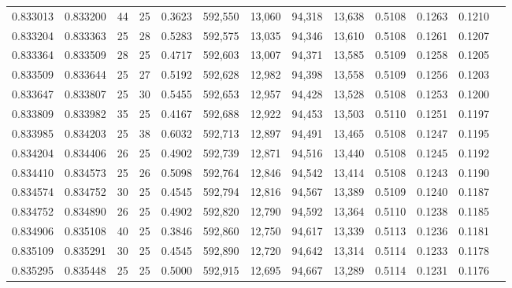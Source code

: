 \begin{tabular}{rrrrrrrrrrrrr}
0.833013 & 0.833200 &    44 &  25 &                                     0.3623 & 592,550 &  13,060 &  94,318 &  13,638 & 0.5108 & 0.1263 & 0.1210 \\
0.833204 & 0.833363 &    25 &  28 &                                     0.5283 & 592,575 &  13,035 &  94,346 &  13,610 & 0.5108 & 0.1261 & 0.1207 \\
0.833364 & 0.833509 &    28 &  25 &                                     0.4717 & 592,603 &  13,007 &  94,371 &  13,585 & 0.5109 & 0.1258 & 0.1205 \\
0.833509 & 0.833644 &    25 &  27 &                                     0.5192 & 592,628 &  12,982 &  94,398 &  13,558 & 0.5109 & 0.1256 & 0.1203 \\
0.833647 & 0.833807 &    25 &  30 &                                     0.5455 & 592,653 &  12,957 &  94,428 &  13,528 & 0.5108 & 0.1253 & 0.1200 \\
0.833809 & 0.833982 &    35 &  25 &                                     0.4167 & 592,688 &  12,922 &  94,453 &  13,503 & 0.5110 & 0.1251 & 0.1197 \\
0.833985 & 0.834203 &    25 &  38 &                                     0.6032 & 592,713 &  12,897 &  94,491 &  13,465 & 0.5108 & 0.1247 & 0.1195 \\
0.834204 & 0.834406 &    26 &  25 &                                     0.4902 & 592,739 &  12,871 &  94,516 &  13,440 & 0.5108 & 0.1245 & 0.1192 \\
0.834410 & 0.834573 &    25 &  26 &                                     0.5098 & 592,764 &  12,846 &  94,542 &  13,414 & 0.5108 & 0.1243 & 0.1190 \\
0.834574 & 0.834752 &    30 &  25 &                                     0.4545 & 592,794 &  12,816 &  94,567 &  13,389 & 0.5109 & 0.1240 & 0.1187 \\
0.834752 & 0.834890 &    26 &  25 &                                     0.4902 & 592,820 &  12,790 &  94,592 &  13,364 & 0.5110 & 0.1238 & 0.1185 \\
0.834906 & 0.835108 &    40 &  25 &                                     0.3846 & 592,860 &  12,750 &  94,617 &  13,339 & 0.5113 & 0.1236 & 0.1181 \\
0.835109 & 0.835291 &    30 &  25 &                                     0.4545 & 592,890 &  12,720 &  94,642 &  13,314 & 0.5114 & 0.1233 & 0.1178 \\
0.835295 & 0.835448 &    25 &  25 &                                     0.5000 & 592,915 &  12,695 &  94,667 &  13,289 & 0.5114 & 0.1231 & 0.1176 \\

\end{tabular}

